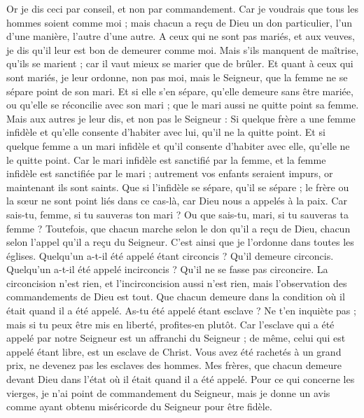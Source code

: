\begin{multicols}{2}
Or je dis ceci par conseil, et non par commandement.
Car je voudrais que tous les hommes soient comme moi ; mais chacun a reçu de Dieu un don particulier, l'un d’une manière, l’autre d’une autre.
A ceux qui ne sont pas mariés, et aux veuves, je dis qu'il leur est bon de demeurer comme moi.
Mais s'ils manquent de maîtrise, qu'ils se marient ; car il vaut mieux se marier que de brûler.
Et quant à ceux qui sont mariés, je leur ordonne, non pas moi, mais le Seigneur, que la femme ne se sépare point de son mari.
Et si elle s'en sépare, qu'elle demeure sans être mariée, ou qu'elle se réconcilie avec son mari ; que le mari aussi ne quitte point sa femme.
Mais aux autres je leur dis, et non pas le Seigneur : Si quelque frère a une femme infidèle et qu'elle consente d'habiter avec lui, qu'il ne la quitte point.
Et si quelque femme a un mari infidèle et qu'il consente d'habiter avec elle, qu'elle ne le quitte point.
Car le mari infidèle est sanctifié par la femme, et la femme infidèle est sanctifiée par le mari ; autrement vos enfants seraient impurs, or maintenant ils sont saints.
Que si l'infidèle se sépare, qu'il se sépare ; le frère ou la sœur ne sont point liés dans ce cas-là, car Dieu nous a appelés à la paix.
Car sais-tu, femme, si tu sauveras ton mari ? Ou que sais-tu, mari, si tu sauveras ta femme ?
Toutefois, que chacun marche selon le don qu'il a reçu de Dieu, chacun selon l’appel qu’il a reçu du Seigneur. C’est ainsi que je l’ordonne dans toutes les églises.
Quelqu'un a-t-il été appelé étant circoncis ? Qu’il demeure circoncis. Quelqu'un a-t-il été appelé incirconcis ? Qu’il ne se fasse pas circoncire.
La circoncision n'est rien, et l’incirconcision aussi n'est rien, mais l'observation des commandements de Dieu est tout.
Que chacun demeure dans la condition où il était quand il a été appelé.
As-tu été appelé étant esclave ? Ne t'en inquiète pas ; mais si tu peux être mis en liberté, profites-en plutôt.
Car l’esclave qui a été appelé par notre Seigneur est un affranchi du Seigneur ; de même, celui qui est appelé étant libre, est un esclave de Christ.
Vous avez été rachetés à un grand prix, ne devenez pas les esclaves des hommes.
Mes frères, que chacun demeure devant Dieu dans l'état où il était quand il a été appelé.
Pour ce qui concerne les vierges, je n'ai point de commandement du Seigneur, mais je donne un avis comme ayant obtenu miséricorde du Seigneur pour être fidèle.

\end{multicols}
